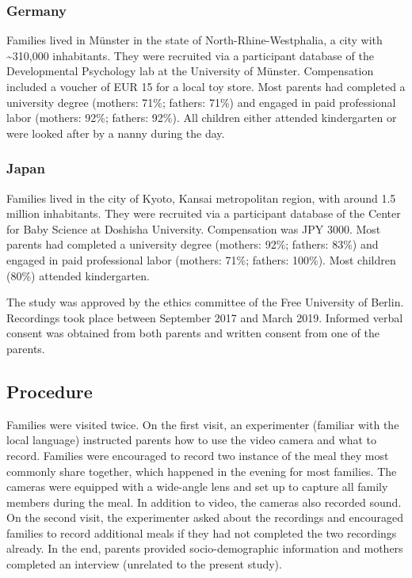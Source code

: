 \documentclass[
  man,floatsintext]{apa6}
\begin{document}
\hypertarget{germany}{%
\subsubsection{Germany}\label{germany}}

Families lived in Münster in the state of North-Rhine-Westphalia, a city with \textasciitilde310,000 inhabitants. They were recruited via a participant database of the Developmental Psychology lab at the University of Münster. Compensation included a voucher of EUR 15 for a local toy store. Most parents had completed a university degree (mothers: 71\%; fathers: 71\%) and engaged in paid professional labor (mothers: 92\%; fathers: 92\%). All children either attended kindergarten or were looked after by a nanny during the day.

\hypertarget{japan}{%
\subsubsection{Japan}\label{japan}}

Families lived in the city of Kyoto, Kansai metropolitan region, with around 1.5 million inhabitants. They were recruited via a participant database of the Center for Baby Science at Doshisha University. Compensation was JPY 3000. Most parents had completed a university degree (mothers: 92\%; fathers: 83\%) and engaged in paid professional labor (mothers: 71\%; fathers: 100\%). Most children (80\%) attended kindergarten.

The study was approved by the ethics committee of the Free University of Berlin. Recordings took place between September 2017 and March 2019. Informed verbal consent was obtained from both parents and written consent from one of the parents.

\hypertarget{procedure}{%
\subsection{Procedure}\label{procedure}}

Families were visited twice. On the first visit, an experimenter (familiar with the local language) instructed parents how to use the video camera and what to record. Families were encouraged to record two instance of the meal they most commonly share together, which happened in the evening for most families. The cameras were equipped with a wide-angle lens and set up to capture all family members during the meal. In addition to video, the cameras also recorded sound. On the second visit, the experimenter asked about the recordings and encouraged families to record additional meals if they had not completed the two recordings already. In the end, parents provided socio-demographic information and mothers completed an interview (unrelated to the present study).
\end{document}
